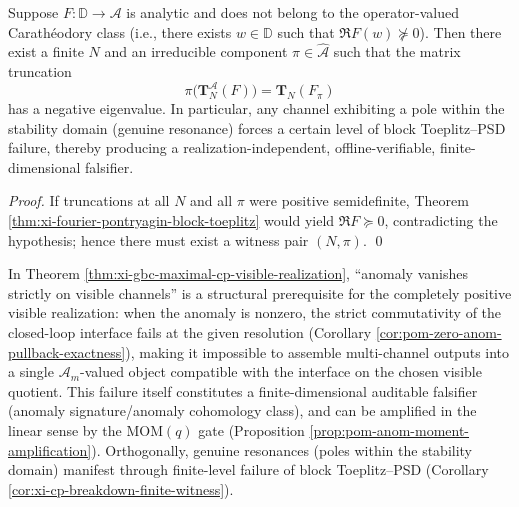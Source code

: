 \begin{corollary}[Complete positivity breakdown \texorpdfstring{$\Rightarrow$}{=>} finite-order block negative inertia]\label{cor:xi-cp-breakdown-finite-witness}
Suppose \(F:\mathbb{D}\to\mathcal{A}\) is analytic and does not belong to the operator-valued Carath\'eodory class (i.e., there exists \(w\in\mathbb{D}\) such that \(\Re F(w)\nsucceq 0\)).
Then there exist a finite \(N\) and an irreducible component \(\pi\in\widehat{\mathcal{A}}\) such that the matrix truncation
\[
\pi\!\bigl(\mathbf{T}^{\mathcal{A}}_N(F)\bigr)=\mathbf{T}_N(F_\pi)
\]
has a negative eigenvalue.
In particular, any channel exhibiting a pole within the stability domain (genuine resonance) forces a certain level of block Toeplitz--PSD failure, thereby producing a realization-independent, offline-verifiable, finite-dimensional falsifier.
\end{corollary}

\begin{proof}
If truncations at all \(N\) and all \(\pi\) were positive semidefinite, Theorem \ref{thm:xi-fourier-pontryagin-block-toeplitz} would yield \(\Re F\succeq 0\), contradicting the hypothesis; hence there must exist a witness pair \((N,\pi)\). \qed
\end{proof}
\begin{remark}\label{rem:xi-anom-as-cp-visible-obstruction}
In Theorem \ref{thm:xi-gbc-maximal-cp-visible-realization}, ``anomaly vanishes strictly on visible channels'' is a structural prerequisite for the completely positive visible realization:
when the anomaly is nonzero, the strict commutativity of the closed-loop interface fails at the given resolution (Corollary \ref{cor:pom-zero-anom-pullback-exactness}), making it impossible to assemble multi-channel outputs into a single \(\mathcal{A}_m\)-valued object compatible with the interface on the chosen visible quotient.
This failure itself constitutes a finite-dimensional auditable falsifier (anomaly signature/anomaly cohomology class), and can be amplified in the linear sense by the MOM\((q)\) gate (Proposition \ref{prop:pom-anom-moment-amplification}).
Orthogonally, genuine resonances (poles within the stability domain) manifest through finite-level failure of block Toeplitz--PSD (Corollary \ref{cor:xi-cp-breakdown-finite-witness}).
\end{remark}
\endinput



